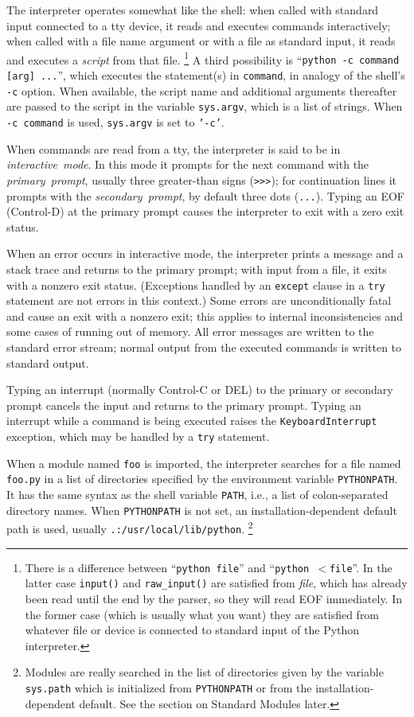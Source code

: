 The interpreter operates somewhat like the {\UNIX} shell: when called with
standard input connected to a tty device, it reads and executes commands
interactively; when called with a file name argument or with a file as
standard input, it reads and executes a
{\em script}
from that file.%
\footnote{
	There is a difference between ``{\tt python file}'' and
	``{\tt python $<$file}''.  In the latter case {\tt input()} and
	{\tt raw\_input()} are satisfied from {\em file}, which has
	already been read until the end by the parser, so they will read
	EOF immediately.  In the former case (which is usually what
	you want) they are satisfied from whatever file or device is
	connected to standard input of the Python interpreter.
}
A third possibility is ``{\tt python -c command [arg] ...}'', which
executes the statement(s) in {\tt command}, in analogy of the shell's
{\tt -c} option.
When available, the script name and additional arguments thereafter are
passed to the script in the variable
{\tt sys.argv},
which is a list of strings.
When {\tt -c command} is used, {\tt sys.argv} is set to {\tt '-c'}.

When commands are read from a tty, the interpreter is said to be in
{\em interactive\ mode}.
In this mode it prompts for the next command with the
{\em primary\ prompt},
usually three greater-than signs ({\tt >>>}); for continuation lines
it prompts with the
{\em secondary\ prompt},
by default three dots ({\tt ...}).
Typing an EOF (Control-D) at the primary prompt causes the interpreter
to exit with a zero exit status.

When an error occurs in interactive mode, the interpreter prints a
message and a stack trace and returns to the primary prompt; with input
from a file, it exits with a nonzero exit status.
(Exceptions handled by an
{\tt except}
clause in a
{\tt try}
statement are not errors in this context.)
Some errors are unconditionally fatal and cause an exit with a nonzero
exit; this applies to internal inconsistencies and some cases of running
out of memory.
All error messages are written to the standard error stream; normal
output from the executed commands is written to standard output.

Typing an interrupt (normally Control-C or DEL) to the primary or
secondary prompt cancels the input and returns to the primary prompt.
Typing an interrupt while a command is being executed raises the
{\tt KeyboardInterrupt}
exception, which may be handled by a
{\tt try}
statement.

When a module named
{\tt foo}
is imported, the interpreter searches for a file named
{\tt foo.py}
in a list of directories specified by the environment variable
{\tt PYTHONPATH}.
It has the same syntax as the {\UNIX} shell variable
{\tt PATH},
i.e., a list of colon-separated directory names.
When
{\tt PYTHONPATH}
is not set, an installation-dependent default path is used, usually
{\tt .:/usr/local/lib/python}.%
\footnote{
	Modules are really searched in the list of directories given by
	the variable {\tt sys.path} which is initialized from
	{\tt PYTHONPATH} or from the installation-dependent default.
	See the section on Standard Modules later.
}

